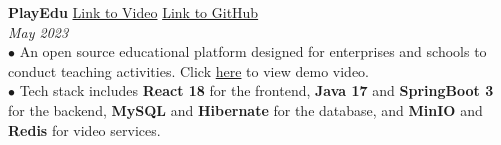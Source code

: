 \documentclass[letterpaper,12pt]{article}
\begin{document}
\textbf{PlayEdu} \hfill \href{https://youtu.be/8IWqM2eHLhc}{Link to Video} \hspace{0.2cm} \href{https://github.com/Zicheng-Li/React-Spring_Boot-PlayEdu}{Link to GitHub} \\
\textit{May 2023} \\
\hspace{0.1cm} $\bullet$ An open source educational platform designed for enterprises and schools to conduct teaching activities. Click \href{https://youtu.be/8IWqM2eHLhc}{here} to view demo video.\\
\hspace{0.1cm} $\bullet$ Tech stack includes \textbf{React 18} for the frontend, \textbf{Java 17} and \textbf{SpringBoot 3} for the backend, \textbf{MySQL} and \textbf{Hibernate} for the database, and \textbf{MinIO} and \textbf{Redis} for video services.

\end{document}
